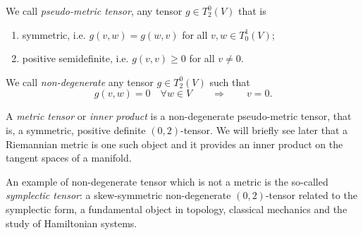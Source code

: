 \begin{definition}\label{def:metric}
  We call \emph{pseudo-metric tensor}, any tensor $g\in T_2^0(V)$ that is
  \begin{enumerate}
    \item symmetric, i.e. $g(v,w) = g(w,v)$ for all $v,w\in T_0^1(V)$;
    \item positive semidefinite, i.e. $g(v,v)\geq0$ for all $v\neq 0$.
  \end{enumerate}

  We call \emph{non-degenerate} any tensor $g\in T_2^0(V)$ such that
  \begin{equation}
    g(v,w) = 0 \quad\forall w\in V \qquad\Longrightarrow\qquad v=0.
  \end{equation}

  A \emph{metric tensor} or \emph{inner product} is a non-degenerate pseudo-metric tensor, that is, a symmetric, positive definite $(0,2)$-tensor.
  We will briefly see later that a Riemannian metric is one such object and it provides an inner product on the tangent spaces of a manifold.

  An example of non-degenerate tensor which is not a metric is the so-called \emph{symplectic tensor}: a skew-symmetric non-degenerate $(0,2)$-tensor related to the symplectic form, a fundamental object in topology, classical mechanics and the study of Hamiltonian systems.
\end{definition}

